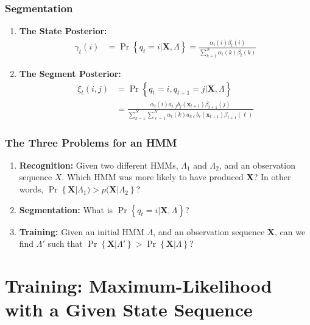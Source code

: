\documentclass{beamer}
\begin{document}
\begin{frame}
  \frametitle{Segmentation}

  \begin{enumerate}
  \item {\bf The State Posterior:}
    \begin{align*}
      \gamma_t(i) & = \Pr\left\{q_t=i|\mathbf{X},\Lambda\right\}
      = \frac{\alpha_t(i)\beta_t(i)}{\sum_{k=1}^N\alpha_t(k)\beta_t(k)}
    \end{align*}
  \item {\bf The Segment Posterior:}
    \begin{align*}
      \xi_t(i,j) & = \Pr\left\{q_t=i,q_{t+1}=j|\mathbf{X},\Lambda\right\}\\
      &= \frac{\alpha_t(i)a_{i,j}b_j(\mathbf{x}_{t+1})\beta_{t+1}(j)}{\sum_{k=1}^N\sum_{\ell=1}^N\alpha_t(k)a_{k\ell}b_\ell(\mathbf{x}_{t+1})\beta_{t+1}(\ell)}
    \end{align*}
  \end{enumerate}
\end{frame}


\begin{frame}
  \frametitle{The Three Problems for an HMM}

  \begin{enumerate}
  \item {\bf Recognition:} Given two different HMMs, $\Lambda_1$ and
    $\Lambda_2$, and an observation sequence $X$.  Which HMM was more
    likely to have produced $\mathbf{X}$?  In other words, 
    $\Pr\left\{\mathbf{X}|\Lambda_1)>p(\mathbf{X}|\Lambda_2\right\}$?
  \item {\bf Segmentation:} What is $\Pr\left\{q_t=i|\mathbf{X},\Lambda\right\}$?
  \item {\bf Training:} Given an initial HMM $\Lambda$, and an
    observation sequence $\mathbf{X}$, can we find $\Lambda'$ such that
    $\Pr\left\{\mathbf{X}|\Lambda'\right\} > \Pr\left\{\mathbf{X}|\Lambda\right\}$?
  \end{enumerate}
\end{frame}


\section[ML]{Training: Maximum-Likelihood with a Given State Sequence}
\setcounter{subsection}{1}
\end{document}
